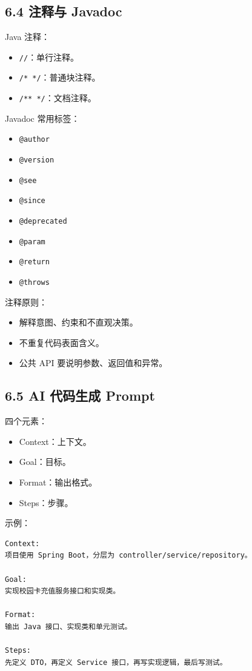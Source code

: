 \documentclass[UTF8,zihao=-4]{ctexart}
\begin{document}
\subsection{6.4 注释与 Javadoc}

Java 注释：

\begin{itemize}
\item \texttt{//}：单行注释。
\item \texttt{/* */}：普通块注释。
\item \texttt{/** */}：文档注释。
\end{itemize}

Javadoc 常用标签：

\begin{itemize}
\item \texttt{@author}
\item \texttt{@version}
\item \texttt{@see}
\item \texttt{@since}
\item \texttt{@deprecated}
\item \texttt{@param}
\item \texttt{@return}
\item \texttt{@throws}
\end{itemize}

注释原则：

\begin{itemize}
\item 解释意图、约束和不直观决策。
\item 不重复代码表面含义。
\item 公共 API 要说明参数、返回值和异常。
\end{itemize}

\subsection{6.5 AI 代码生成 Prompt}

四个元素：

\begin{itemize}
\item Context：上下文。
\item Goal：目标。
\item Format：输出格式。
\item Steps：步骤。
\end{itemize}

示例：

\small
\begin{verbatim}
Context:
项目使用 Spring Boot，分层为 controller/service/repository。

Goal:
实现校园卡充值服务接口和实现类。

Format:
输出 Java 接口、实现类和单元测试。

Steps:
先定义 DTO，再定义 Service 接口，再写实现逻辑，最后写测试。
\end{verbatim}
\normalsize
\end{document}
